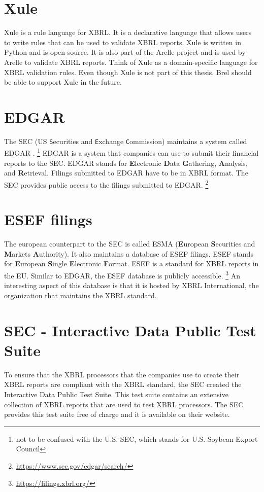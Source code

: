 \section{Xule}
Xule\cite{xule} is a rule language for XBRL.
It is a declarative language that allows users to write rules that can be used to validate XBRL reports.
Xule is written in Python and is open source.
It is also part of the Arelle project and is used by Arelle to validate XBRL reports.
Think of Xule as a domain-specific language for XBRL validation rules.
Even though Xule is not part of this thesis, Brel should be able to support Xule in the future.

\section{EDGAR}
\label{sec:edgar}
The SEC (US \texttt{S}ecurities and \texttt{E}xchange \texttt{C}ommission) maintains a system called EDGAR \cite{sec_edgar}. \footnote{not to be confused with the U.S. SEC, which stands for U.S. Soybean Export Council}
EDGAR is a system that companies can use to submit their financial reports to the SEC.
EDGAR stands for \textbf{E}lectronic \textbf{D}ata \textbf{G}athering, \textbf{A}nalysis, and \textbf{R}etrieval.
Filings submitted to EDGAR have to be in XBRL format.
The SEC provides public access to the filings submitted to EDGAR. \footnote{\url{https://www.sec.gov/edgar/search/}}

\section{ESEF filings}
The european counterpart to the SEC is called ESMA (\textbf{E}uropean \textbf{S}ecurities and \textbf{M}arkets \textbf{A}uthority).
It also maintains a database of ESEF filings\cite{esma_database}.
ESEF stands for \textbf{E}uropean \textbf{S}ingle \textbf{E}lectronic \textbf{F}ormat.
ESEF is a standard for XBRL reports in the EU.
Similar to EDGAR, the ESEF database is publicly accessible. \footnote{\url{https://filings.xbrl.org/}}
An interesting aspect of this database is that it is hosted by XBRL International, the organization that maintains the XBRL standard.

\section{SEC - Interactive Data Public Test Suite}
\label{sec:idpts}
To ensure that the XBRL processors that the companies use to create their XBRL reports are compliant with the XBRL standard, the SEC created the Interactive Data Public Test Suite\cite{sec_idpts}.
This test suite contains an extensive collection of XBRL reports that are used to test XBRL processors.
The SEC provides this test suite free of charge and it is available on their website.

